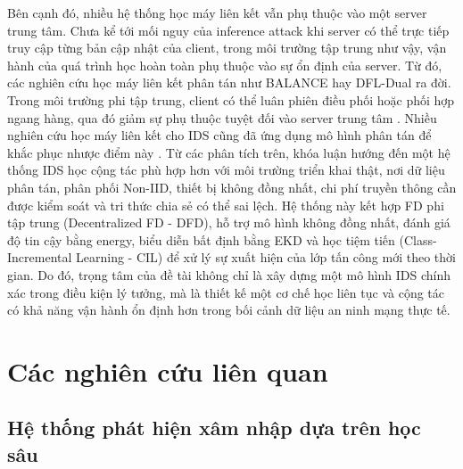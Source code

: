 \bigbreak\noindent
Bên cạnh đó, nhiều hệ thống học máy liên kết vẫn phụ thuộc vào một server trung tâm. Chưa kể tới mối nguy của inference attack khi server có thể trực tiếp truy cập từng bản cập nhật của client, trong môi trường tập trung như vậy, vận hành của quá trình học hoàn toàn phụ thuộc vào sự ổn định của server. Từ đó, các nghiên cứu học máy liên kết phân tán như BALANCE \cite{fang2024balance} hay DFL-Dual \cite{sun2024dfldual} ra đời. Trong môi trường phi tập trung, client có thể luân phiên điều phối hoặc phối hợp ngang hàng, qua đó giảm sự phụ thuộc tuyệt đối vào server trung tâm \cite{braintorrent,beltran2023dflsurvey}. Nhiều nghiên cứu học máy liên kết cho IDS cũng đã ứng dụng mô hình phân tán để khắc phục nhược điểm này \cite{nakip2023dfl-ids, friha20232dfl-ids}.
\bigbreak\noindent
Từ các phân tích trên, khóa luận hướng đến một hệ thống IDS học cộng tác phù hợp hơn với môi trường triển khai thật, nơi dữ liệu phân tán, phân phối Non-IID, thiết bị không đồng nhất, chi phí truyền thông cần được kiểm soát và tri thức chia sẻ có thể sai lệch. Hệ thống này kết hợp FD phi tập trung (Decentralized FD - DFD), hỗ trợ mô hình không đồng nhất, đánh giá độ tin cậy bằng energy, biểu diễn bất định bằng EKD và học tiệm tiến (Class-Incremental Learning - CIL) để xử lý sự xuất hiện của lớp tấn công mới theo thời gian. Do đó, trọng tâm của đề tài không chỉ là xây dựng một mô hình IDS chính xác trong điều kiện lý tưởng, mà là thiết kế một cơ chế học liên tục và cộng tác có khả năng vận hành ổn định hơn trong bối cảnh dữ liệu an ninh mạng thực tế.

\section{Các nghiên cứu liên quan}

\subsection{Hệ thống phát hiện xâm nhập dựa trên học sâu}


